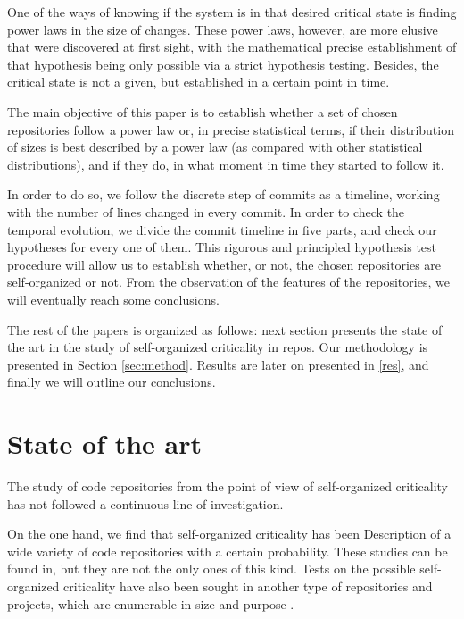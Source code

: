 \documentclass[conference]{IEEEtran}
\begin{document}
One of the ways of knowing if the system is in that desired critical
state is finding power laws in the size of changes. These power laws,
however, are more elusive that were discovered at first sight, with
the mathematical precise establishment of that hypothesis being only
possible via a strict hypothesis testing. Besides, the critical state
is not a given, but established in a certain point in time.

The main objective of this paper is to establish whether a set of
chosen repositories follow a power law or, in precise statistical terms,
if their distribution of sizes is best described by a power law (as
compared with other statistical distributions), and if they do, in
what moment in time they started to follow it.

In order to do so, we follow the discrete step of commits as a
timeline, working with the number of lines changed in every commit. In
order to check the temporal evolution, we divide the commit timeline
in five parts, and check our hypotheses for every one of them. This
rigorous and principled hypothesis test procedure will allow us to
establish whether, or not, the chosen repositories are self-organized
or not. From the observation of the features of the repositories, we
will eventually reach some conclusions.


The rest of the papers is organized as follows: next section presents
the state of the art in the study of self-organized criticality in
repos. Our methodology is presented in Section
\ref{sec:method}. Results are later on presented in \ref{res}, and
finally we will outline our conclusions.

\section{State of the art}\label{soa}


The study of code repositories from the point of view of
self-organized criticality has not followed a continuous line of
investigation.

On the one hand, we find that self-organized criticality has been
Description of a wide variety of code repositories with a certain
probability. These studies can be found
in\cite{wu2007empirical,gorshenev2004punctuated}, but they are not the
only ones of this kind. Tests on the possible self-organized
criticality have also been sought in another type of repositories and
projects, which are enumerable in size and purpose
\cite{Merelo2016:repomining,merelo16:slash,merelo16:self,merelo2017self}.
\end{document}
